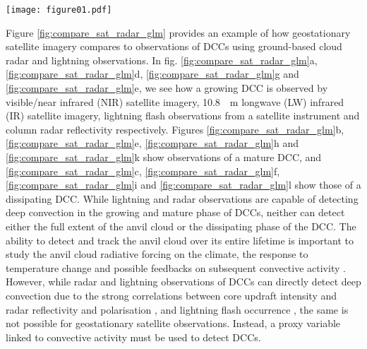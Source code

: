 \begin{figure*}[t]
    \centering
    \texttt{[image: figure01.pdf]}
    \caption{Observations of a cluster of deep convective clouds over North-West Florida throughout three stages of their lifecycle. This cluster of DCCs occurred on the afternoon of 19\textsuperscript{th} June 2018. The "growing" column were observed at 17:00 UTC, the "mature" column at 19:00 UTC, and the dissipating column at 21:00 UTC. Note that, unless otherwise specified, this case study is used for all subsequent figures in this article.}
    \label{fig:compare_sat_radar_glm}
\end{figure*}

Figure \ref{fig:compare_sat_radar_glm} provides an example of how geostationary satellite imagery compares to observations of DCCs using ground-based cloud radar and lightning observations.
In fig. \ref{fig:compare_sat_radar_glm}a, \ref{fig:compare_sat_radar_glm}d, \ref{fig:compare_sat_radar_glm}g and \ref{fig:compare_sat_radar_glm}e, we see how a growing DCC is observed by visible/near infrared (NIR) satellite imagery, 10.8~\unit{\mu m} longwave (LW) infrared (IR) satellite imagery, lightning flash observations from a satellite instrument and column radar reflectivity respectively.
Figures \ref{fig:compare_sat_radar_glm}b, \ref{fig:compare_sat_radar_glm}e, \ref{fig:compare_sat_radar_glm}h and \ref{fig:compare_sat_radar_glm}k show observations of a mature DCC, and \ref{fig:compare_sat_radar_glm}c, \ref{fig:compare_sat_radar_glm}f, \ref{fig:compare_sat_radar_glm}i and \ref{fig:compare_sat_radar_glm}l show those of a dissipating DCC.
While lightning and radar observations are capable of detecting deep convection in the growing and mature phase of DCCs, neither can detect either the full extent of the anvil cloud or the dissipating phase of the DCC.
The ability to detect and track the anvil cloud over its entire lifetime is important to study the anvil cloud radiative forcing on the climate, the response to temperature change \citep{bony_thermodynamic_2016, hartmann_tropical_2016, ceppi_cloud_2017, gasparini_what_2019} and possible feedbacks on subsequent convective activity \citep{varble_erroneous_2018}.
However, while radar and lightning observations of DCCs can directly detect deep convection due to the strong correlations between core updraft intensity and radar reflectivity and polarisation \citep{austin_relation_1987, rosenfeld_general_1993, zipser_vertical_1994},  and lightning flash occurrence \citep{williams_relationship_1989, deierling_total_2008, wang_relationship_2017}, the same is not possible for geostationary satellite observations.
Instead, a proxy variable linked to convective activity must be used to detect DCCs.

